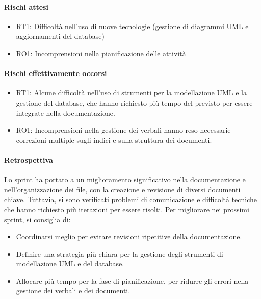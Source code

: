 \documentclass{article}
\begin{document}
            \paragraph{Rischi attesi}
            \begin{itemize}
                \item RT1: Difficoltà nell’uso di nuove tecnologie (gestione di diagrammi UML e aggiornamenti del database)
                \item RO1: Incomprensioni nella pianificazione delle attività
            \end{itemize}
            
            \paragraph{Rischi effettivamente occorsi}
            \begin{itemize}
                \item RT1: Alcune difficoltà nell'uso di strumenti per la modellazione UML e la gestione del database, che hanno richiesto più tempo del previsto per essere integrate nella documentazione.
                \item RO1: Incomprensioni nella gestione dei verbali hanno reso necessarie correzioni multiple sugli indici e sulla struttura dei documenti.
            \end{itemize}
            
            \paragraph{Retrospettiva}
            Lo sprint ha portato a un miglioramento significativo nella documentazione e nell'organizzazione dei file, con la creazione e revisione di diversi documenti chiave. Tuttavia, si sono verificati problemi di comunicazione e difficoltà tecniche che hanno richiesto più iterazioni per essere risolti. Per migliorare nei prossimi sprint, si consiglia di:
            \begin{itemize}
                \item Coordinarsi meglio per evitare revisioni ripetitive della documentazione.
                \item Definire una strategia più chiara per la gestione degli strumenti di modellazione UML e del database.
                \item Allocare più tempo per la fase di pianificazione, per ridurre gli errori nella gestione dei verbali e dei documenti.
            \end{itemize}
                
\end{document}
